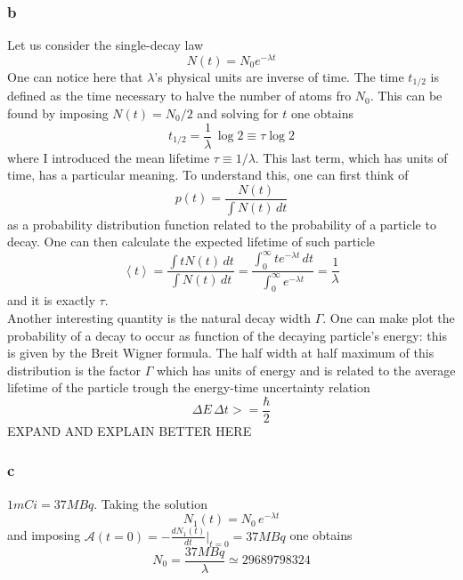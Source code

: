 \subsubsection*{b}
Let us consider the single-decay law 
\begin{equation*}
    N(t) = N_0 e^{-\lambda t}
\end{equation*}
One can notice here that $\lambda$'s physical units are inverse of time. The time $t_{1/2}$ is defined as the time necessary to halve the number of atoms fro $N_0$. 
This can be found by imposing $N(t) = N_0/2$ and solving for $t$ one obtains 
\begin{equation*}
    t_{1/2} = \frac{1}{\lambda} \, \log 2 \equiv \tau \log 2
\end{equation*}
where I introduced the mean lifetime $\tau \equiv 1/\lambda$. This last term, which has units of time, has a particular meaning. To understand this, one can first think 
of 
\begin{equation*}
    p(t) = \frac{N(t)}{\int N(t) \, dt}
\end{equation*} 
as a probability distribution function related to the probability of a particle to decay. One can then calculate the expected lifetime of such particle
\begin{equation*}
    \left\langle t \right\rangle = \frac{\int t N(t) \, dt}{\int N(t) \, dt} = \frac{\int_0^{\infty} te^{-\lambda t} \, dt}{\int_0^{\infty} e^{-\lambda t}} = \frac{1}{\lambda}
\end{equation*}
and it is exactly $\tau$. \\
Another interesting quantity is the natural decay width $\Gamma$. One can make plot the probability of a decay to occur as function of the decaying particle's energy: this is given by the
Breit Wigner formula. The half width at half maximum of this distribution is the factor $\Gamma$ which has units of energy and is related to the average lifetime of the particle trough the 
energy-time uncertainty relation
\begin{equation*}
    \Delta E \, \Delta t >= \frac{\hbar}{2}
\end{equation*}
EXPAND AND EXPLAIN BETTER HERE

\subsubsection*{c}
$1mCi = 37MBq$. Taking the solution
\begin{equation*}
    N_1(t) = N_0 \, e^{-\lambda t}
\end{equation*}
and imposing $\mathcal{A}(t=0) = -\frac{dN_1(t)}{dt}|_{t=0} = 37MBq$ one obtains
\begin{equation*}
    N_0 = \frac{37 MBq}{\lambda} \simeq 29689798324
\end{equation*}

